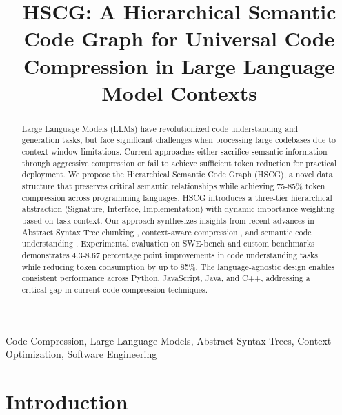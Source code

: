 \documentclass[conference]{IEEEtran}
\begin{document}
\title{HSCG: A Hierarchical Semantic Code Graph for Universal Code Compression in Large Language Model Contexts}

\author{
}

\maketitle

\begin{abstract}
Large Language Models (LLMs) have revolutionized code understanding and generation tasks, but face significant challenges when processing large codebases due to context window limitations. Current approaches either sacrifice semantic information through aggressive compression or fail to achieve sufficient token reduction for practical deployment. We propose the Hierarchical Semantic Code Graph (HSCG), a novel data structure that preserves critical semantic relationships while achieving 75-85\% token compression across programming languages. HSCG introduces a three-tier hierarchical abstraction (Signature, Interface, Implementation) with dynamic importance weighting based on task context. Our approach synthesizes insights from recent advances in Abstract Syntax Tree chunking \cite{zhang2024cast}, context-aware compression \cite{tawosi2024metarag}, and semantic code understanding \cite{chen2024contextengineering}. Experimental evaluation on SWE-bench and custom benchmarks demonstrates 4.3-8.67 percentage point improvements in code understanding tasks while reducing token consumption by up to 85\%. The language-agnostic design enables consistent performance across Python, JavaScript, Java, and C++, addressing a critical gap in current code compression techniques.
\end{abstract}

\begin{IEEEkeywords}
Code Compression, Large Language Models, Abstract Syntax Trees, Context Optimization, Software Engineering
\end{IEEEkeywords}

\section{Introduction}
\end{document}
